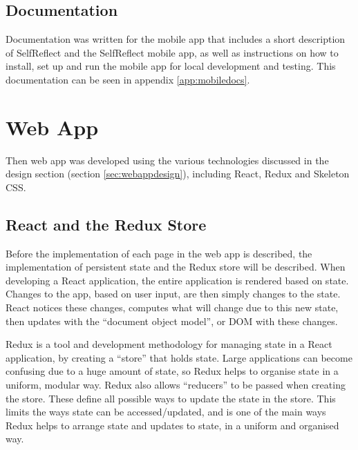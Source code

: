 \documentclass[11pt,openright,a4paper]{report}
\begin{document}
\subsection{Documentation}
Documentation was written for the mobile app that includes a short description of SelfReflect and the SelfReflect mobile app, as well as instructions on how to install, set up and run the mobile app for local development and testing. This documentation can be seen in appendix \ref{app:mobiledocs}.

\section{Web App}
Then web app was developed using the various technologies discussed in the design section (section \ref{sec:webappdesign}), including React, Redux and Skeleton CSS.

\subsection{React and the Redux Store}
Before the implementation of each page in the web app is described, the implementation of persistent state and the Redux store will be described. When developing a React application, the entire application is rendered based on state. Changes to the app, based on user input, are then simply changes to the state. React notices these changes, computes what will change due to this new state, then updates with the \enquote{document object model}, or DOM with these changes.

Redux is a tool and development methodology for managing state in a React application, by creating a \enquote{store} that holds state. Large applications can become confusing due to a huge amount of state, so Redux helps to organise state in a uniform, modular way. Redux also allows \enquote{reducers} to be passed when creating the store. These define all possible ways to update the state in the store. This limits the ways state can be accessed/updated, and is one of the main ways Redux helps to arrange state and updates to state, in a uniform and organised way.
\end{document}
